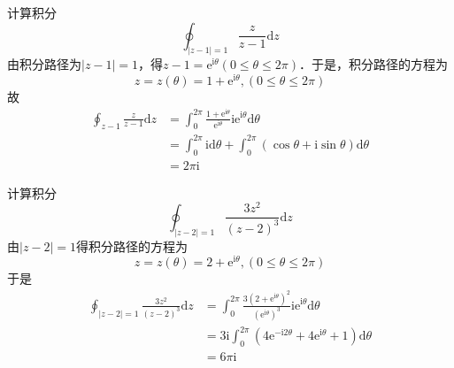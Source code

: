 \begin{example}{}
计算积分
\begin{equation}
\oint_{|z-1|=1} \frac{z}{z-1} \mathrm{d} z
\end{equation}
由积分路径为$|z -1|=1$，得$z-1=\mathrm{e}^{\mathrm{i} \theta}(0 \leqslant \theta \leqslant 2 \pi)$．于是，积分路径的方程为
\begin{equation}
z=z(\theta)=1+\mathrm{e}^{\mathrm{i} \theta},(0 \leqslant \theta \leqslant 2 \pi)
\end{equation}
故
\begin{equation}
\begin{aligned} \oint_{z-1} \frac{z}{z-1} \mathrm{d} z &=\int_{0}^{2 \pi} \frac{1+\mathrm{e}^{\mathrm{i} \theta}}{\mathrm{e}^{\mathrm{i} \theta}} \mathrm{ie}^{\mathrm{i} \theta} \mathrm{d} \theta \\ &=\int_{0}^{2 \pi} \mathrm{id} \theta+\int_{0}^{2 \pi}(\cos \theta+\mathrm{i} \sin \theta) \mathrm{d} \theta \\ &=2 \pi \mathrm{i} \end{aligned}
\end{equation}
\end{example}

\begin{example}{}
计算积分
\begin{equation}
\oint_{|z-2|=1} \frac{3 z^{2}}{(z-2)^{3}} \mathrm{d} z
\end{equation}
由$ |z - 2| =1$得积分路径的方程为
\begin{equation}
z=z(\theta)=2+\mathrm{e}^{\mathrm{i} \theta},(0 \leqslant \theta \leqslant 2 \pi)
\end{equation}
于是
\begin{equation}
\begin{aligned} \oint_{|z-2|=1} \frac{3 z^{2}}{(z-2)^{3}} \mathrm{d} z &=\int_{0}^{2 \pi} \frac{3\left(2+\mathrm{e}^{\mathrm{i} \theta}\right)^{2}}{\left(\mathrm{e}^{\mathrm{i} \theta}\right)^{3}} \mathrm{ie}^{\mathrm{i} \theta} \mathrm{d} \theta \\ &=3 \mathrm{i} \int_{0}^{2 \pi}\left(4 \mathrm{e}^{-\mathrm{i} 2 \theta}+4 \mathrm{e}^{\mathrm{i} \theta}+1\right) \mathrm{d} \theta \\ &=6 \pi \mathrm{i} \end{aligned}
\end{equation}
\end{example}